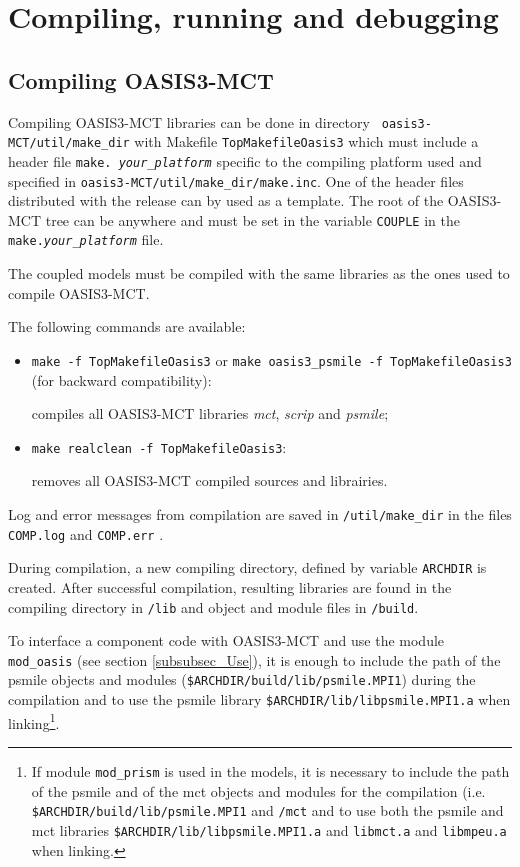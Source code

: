 \newpage
%

\chapter{Compiling, running and debugging}
\label{sec_compilationrunning}

\section{Compiling OASIS3-MCT}
\label{subsec_compile}

Compiling OASIS3-MCT libraries can be done in directory {\tt
  oasis3-MCT/util/make\_dir} with Makefile {\tt TopMakefileOasis3}
which must include a header file {\tt make.{\it
    your\_platform}} specific to the compiling platform used and
specified in {\tt oasis3-MCT/util/make\_dir/make.inc}.  One of the
header files distributed with the release can by used as a template.
The root of the OASIS3-MCT tree can be anywhere and must be set in the
variable {\tt COUPLE} in the {\tt make.{\it your\_platform}} file.

The coupled models must be compiled with the same libraries as the ones
used to compile OASIS3-MCT.

The following commands are available:

\begin{itemize}
\item {\tt make -f TopMakefileOasis3} or {\tt make oasis3\_psmile -f
    TopMakefileOasis3} (for backward compatibility):

  compiles all OASIS3-MCT libraries {\it mct}, {\it scrip} and {\it
    psmile};

\item {\tt make realclean -f TopMakefileOasis3}:

  removes all OASIS3-MCT compiled sources and librairies.

\end{itemize}

Log and error messages from compilation are saved in {\tt /util/make\_dir} in the files
{\tt COMP.log} and {\tt COMP.err} .

During compilation, a new compiling directory, defined by variable
{\tt ARCHDIR} is created.  After successful compilation, resulting
libraries are found in the compiling directory in {\tt /lib} and
object and module files in {\tt /build}. 

To interface  a component code with OASIS3-MCT and use the module {\tt mod\_oasis} (see section \ref{subsubsec_Use}), it is enough to include the path of the psmile objects and
modules ({\tt \$ARCHDIR/build/lib/psmile.MPI1}) during the compilation and to use the psmile library {\tt \$ARCHDIR/lib/libpsmile.MPI1.a} when
linking\footnote{If module {\tt mod\_prism} is used in the models, it is necessary to
include the path of the psmile and of the mct objects and modules for
the compilation (i.e. {\tt \$ARCHDIR/build/lib/psmile.MPI1} and {\tt /mct} and to use both the psmile and mct libraries {\tt \$ARCHDIR/lib/libpsmile.MPI1.a} and {\tt libmct.a} and {\tt libmpeu.a} when linking.}.

